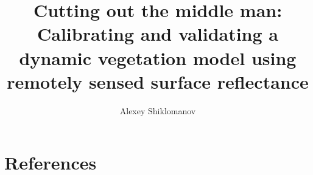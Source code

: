 \documentclass{article}
\title{Cutting out the middle man: Calibrating and validating a dynamic vegetation model using remotely sensed surface reflectance}
\author{Alexey Shiklomanov}
\begin{document}
\maketitle






\section{References}

\printbibliography

% 
\end{document}
